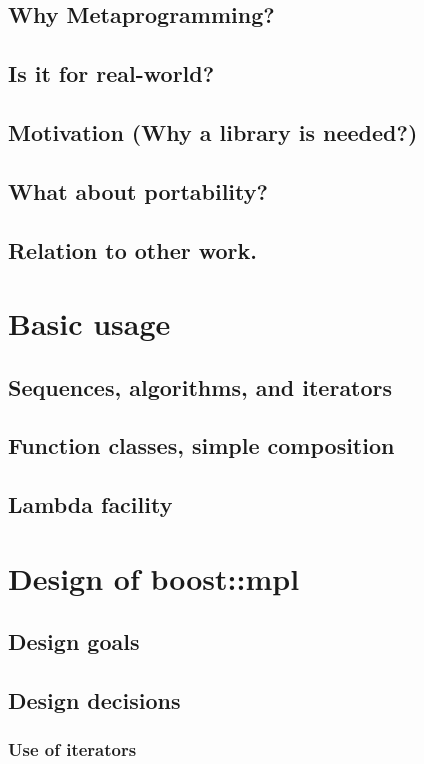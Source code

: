 \documentclass{netobjectdays}
\begin{document}
\subsection{Why Metaprogramming?}


\subsection{Is it for real-world? }
\subsection{Motivation (Why a library is needed?)}
\subsection{What about portability? }
\subsection{Relation to other work.}

\section{Basic usage}
\subsection{Sequences, algorithms, and iterators}
\subsection{Function classes, simple composition}
\subsection{Lambda facility}

\section{Design of boost::mpl}
\subsection{Design goals}
\subsection{Design decisions}
\subsubsection{Use of iterators}
\end{document}

